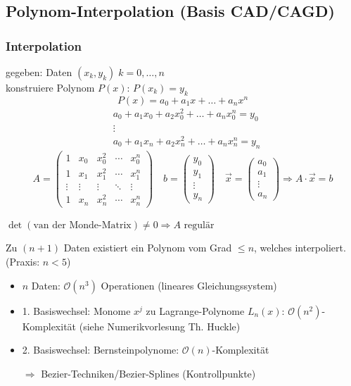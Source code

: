 
\subsection{Polynom-Interpolation (Basis CAD/CAGD)}

\subsubsection*{Interpolation}
\label{interpolation}%
gegeben: Daten $(x_k, y_k)\;k=0,\ldots,n$\\
konstruiere Polynom $P(x)$: $P(x_k) = y_k$
%
\[ P(x) = a_0 + a_1x + \ldots + a_nx^n \]
\vspace{-1cm}
\begin{align*}
&a_0 + a_1x_0 + a_2x_0^2 + \ldots + a_nx_0^n = y_0 \\
&\vdots \\
&a_0 + a_1x_n + a_2x_n^2 + \ldots + a_nx_n^n = y_n
\end{align*}
\[
A = 
\begin{pmatrix}
	1 & x_0 & x_0^2 & \cdots & x_0^n \\
	1 & x_1 & x_1^2 & \cdots & x_1^n \\
	\vdots & \vdots & \vdots & \ddots & \vdots \\
	1 & x_n & x_n^2 & \cdots & x_n^n
\end{pmatrix} \quad
b = \begin{pmatrix}	y_0 \\	y_1 \\	\vdots \\	y_n \end{pmatrix} \quad
\vec{x} = \begin{pmatrix}	a_0 \\	a_1 \\	\vdots \\	a_n \end{pmatrix}
\Rightarrow
A \cdot \vec{x} = b
\]

\noindent $\det(\text{van der Monde-Matrix}) \neq 0 \Rightarrow A\text{ regulär}$

\begin{proposition}
	Zu $(n + 1)$ Daten existiert ein Polynom vom Grad $\le n$, welches interpoliert. (Praxis: $n < 5$)
\end{proposition}

\begin{note}
  \begin{itemize}
    \item $n$ Daten: $\mathcal O (n^3)$ Operationen (lineares Gleichungssystem)
    \item 1. Basiswechsel: Monome $x^j$ zu Lagrange-Polynome $L_n(x)$: $\mathcal O (n^2)$-Komplexität (siehe Numerikvorlesung Th. Huckle)
    \item 2. Basiswechsel: Bernsteinpolynome: $\mathcal O (n)$-Komplexität
    \item[$\Rightarrow$] Bezier-Techniken/Bezier-Splines (Kontrollpunkte)
  \end{itemize}
\end{note}

